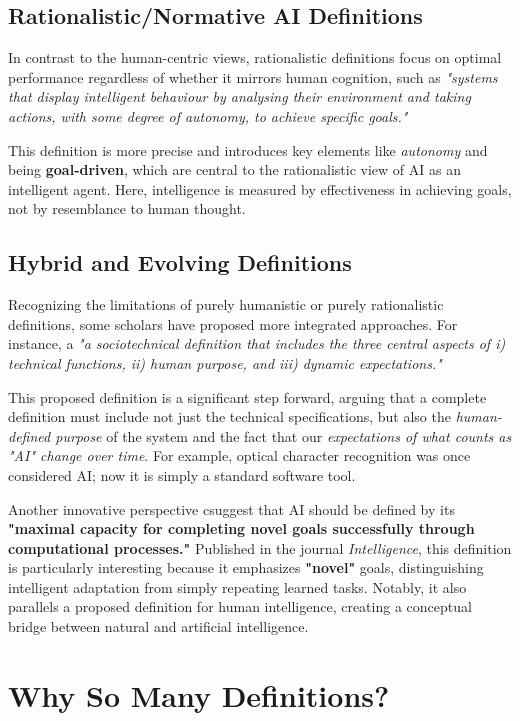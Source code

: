 \documentclass{tufte-handout}
\begin{document}
\subsection{Rationalistic/Normative AI Definitions}

In contrast to the human-centric views, rationalistic definitions focus on optimal performance regardless of whether it mirrors human cognition, such as  \textit{"systems that display intelligent behaviour by analysing their environment and taking actions, with some degree of autonomy, to achieve specific goals."}

This definition is more precise and introduces key elements like \textit{autonomy} and being \textbf{goal-driven}, which are central to the rationalistic view of AI as an intelligent agent. Here, intelligence is measured by effectiveness in achieving goals, not by resemblance to human thought.

\subsection{Hybrid and Evolving Definitions}

Recognizing the limitations of purely humanistic or purely rationalistic definitions, some scholars have proposed more integrated approaches. For instance, a \textit{"a sociotechnical definition that includes the three central aspects of i) technical functions, ii) human purpose, and iii) dynamic expectations."}

This proposed definition is a significant step forward, arguing that a complete definition must include not just the technical specifications, but also the \textit{human-defined purpose} of the system and the fact that our \textit{expectations of what counts as "AI" change over time}. For example, optical character recognition was once considered AI; now it is simply a standard software tool.

Another innovative perspective csuggest  that AI should be defined by its \textbf{"maximal capacity for completing novel goals successfully through computational processes."} Published in the journal \textit{Intelligence}, this definition is particularly interesting because it emphasizes \textbf{"novel"} goals, distinguishing intelligent adaptation from simply repeating learned tasks. Notably, it also parallels a proposed definition for human intelligence, creating a conceptual bridge between natural and artificial intelligence.

\section{Why So Many Definitions?}
\end{document}
